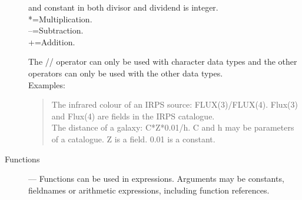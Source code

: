 \begin{description}
\begin{tabbing}
\>\>\>and constant in both divisor and dividend is integer.\\
\>*\>=\>Multiplication.\\
\>--\>=\>Subtraction.\\
\>+\>=\>Addition.
\end{tabbing}
The // operator can only be used with character data types and the other
operators can only be used with the other data types.\\
Examples:
\begin{quote}
The infrared colour of an IRPS source:  FLUX(3)/FLUX(4).
Flux(3) and Flux(4) are fields in the IRPS catalogue.\\
The distance of a galaxy:  C*Z*0.01/h.
C and h may be parameters of a catalogue.
Z is a field.
0.01 is a constant.
\end{quote}
\item [Functions] ---
Functions can be used in expressions.
Arguments may be constants, fieldnames or arithmetic expressions,
including function references.


\end{description}
